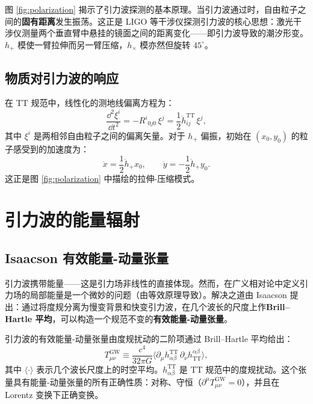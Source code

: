 \begin{note}[测地线偏离与引力波探测]
图 \ref{fig:polarization} 揭示了引力波探测的基本原理。当引力波通过时，自由粒子之间的\textbf{固有距离}发生振荡。这正是 LIGO 等干涉仪探测引力波的核心思想：激光干涉仪测量两个垂直臂中悬挂的镜面之间的距离变化——即引力波导致的潮汐形变。$h_+$ 模使一臂拉伸而另一臂压缩，$h_\times$ 模亦然但旋转 $45^\circ$。
\end{note}

\subsection{物质对引力波的响应}

在 TT 规范中，线性化的测地线偏离方程为：
\begin{equation}
    \frac{\dd^2 \xi^i}{\dd t^2} = -R^i{}_{0j0}\,\xi^j = \frac{1}{2}\ddot{h}_{ij}^{\text{TT}}\,\xi^j,
    \label{eq:geodesic_deviation}
\end{equation}
其中 $\xi^i$ 是两相邻自由粒子之间的偏离矢量。对于 $h_+$ 偏振，初始在 $(x_0, y_0)$ 的粒子感受到的加速度为：
\begin{equation}
    \ddot{x} = \frac{1}{2}\ddot{h}_+ x_0, \qquad \ddot{y} = -\frac{1}{2}\ddot{h}_+ y_0.
\end{equation}
这正是图 \ref{fig:polarization} 中描绘的拉伸-压缩模式。

\section{引力波的能量辐射}
\label{sec:energy_radiation}

\subsection{Isaacson 有效能量-动量张量}

引力波携带能量——这是引力场非线性的直接体现。然而，在广义相对论中定义引力场的局部能量是一个微妙的问题（由等效原理导致）。解决之道由 Isaacson 提出：通过将度规分离为慢变背景和快变引力波，在几个波长的尺度上作\textbf{Brill--Hartle 平均}，可以构造一个规范不变的\textbf{有效能量-动量张量}。

\begin{definition}
引力波的有效能量-动量张量由度规扰动的二阶项通过 Brill--Hartle 平均给出：
\begin{equation}
    \boxed{T_{\mu\nu}^{\text{GW}} \equiv \frac{c^4}{32\pi G} \langle \partial_\mu h_{\alpha\beta}^{\text{TT}} \, \partial_\nu h^{\alpha\beta}_{\text{TT}} \rangle},
    \label{eq:Isaacson}
\end{equation}
其中 $\langle \cdot \rangle$ 表示几个波长尺度上的时空平均。$h_{\alpha\beta}^{\text{TT}}$ 是 TT 规范中的度规扰动。这个张量具有能量-动量张量的所有正确性质：对称、守恒（$\partial^\mu T_{\mu\nu}^{\text{GW}} = 0$），并且在 Lorentz 变换下正确变换。
\end{definition}

